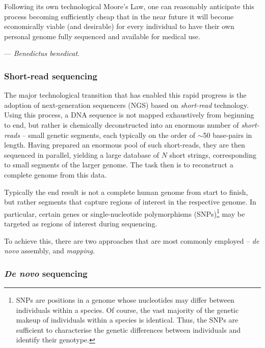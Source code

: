 Following its own technological Moore's Law, one can reasonably anticipate this process becoming sufficiently cheap that in the near future it will become economically viable (and desirable) for every individual to have their own personal genome fully sequenced and available for medical use.

--- \textit{Benedictus benedicat}.

%
%

\subsubsection{Short-read sequencing}

The major technological transition that has enabled this rapid progress is the adoption of next-generation sequencers (NGS) based on \textit{short-read} technology. Using this process, a DNA sequence is not mapped exhaustively from beginning to end, but rather is chemically deconstructed into an enormous number of \textit{short-reads} -- small genetic segments, each typically on the order of $\sim$50 base-pairs in length. Having prepared an enormous pool of such short-reads, they are then sequenced in parallel, yielding a large database of $N$ short strings, corresponding to small segments of the larger genome. The task then is to reconstruct a complete genome from this data.

Typically the end result is not a complete human genome from start to finish, but rather segments that capture regions of interest in the respective genome. In particular, certain genes or single-nucleotide polymorphisms (SNPs)\footnote{SNPs are positions in a genome whose nucleotides may differ between individuals within a species. Of course, the vast majority of the genetic makeup of individuals within a species is identical. Thus, the SNPs are sufficient to characterise the genetic differences between individuals and identify their genotype.} may be targeted as regions of interest during sequencing.

To achieve this, there are two approaches that are most commonly employed -- \textit{de novo} assembly, and \textit{mapping}.

%
%

\subsubsection{\textit{De novo} sequencing}

